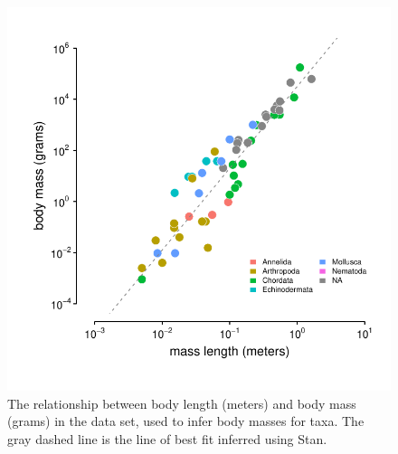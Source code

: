\documentclass[11pt]{article}
\begin{document}
\begin{figure}[!htb]
  \centering
  \includegraphics[]{figures/body_mass_length.pdf}

  \caption{The relationship between body length (meters) and body mass (grams)
    in the \textcite{Romiguier2014-bp} data set, used to infer body masses for
  taxa. The gray dashed line is the line of best fit inferred using Stan.}

  \label{suppfig:body-mass-length}
\end{figure}
\end{document}
